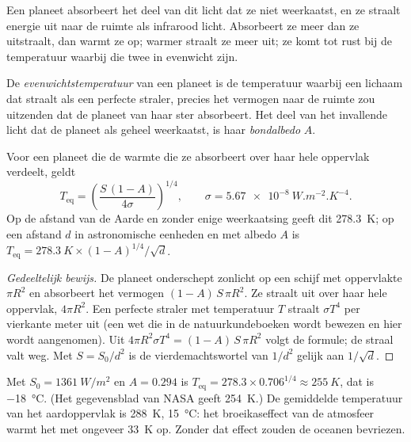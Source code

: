 Een planeet absorbeert het deel van dit licht dat ze niet weerkaatst, en ze
straalt energie uit naar de ruimte als infrarood licht. Absorbeert ze meer dan
ze uitstraalt, dan warmt ze op; warmer straalt ze meer uit; ze komt tot rust
bij de temperatuur waarbij die twee in evenwicht zijn.

\begin{definition}[Evenwichtstemperatuur]\label{def:g10:habitable-planet:equilibrium-temperature}
De \emph{evenwichtstemperatuur} van een
planeet is de temperatuur waarbij een lichaam dat straalt als een perfecte
straler, precies het vermogen naar de ruimte zou uitzenden dat de planeet van
haar ster absorbeert. Het deel van het invallende licht dat de planeet als
geheel weerkaatst, is haar \emph{bondalbedo} $A$.
\end{definition}

\begin{proposition}\label{prop:g10:habitable-planet:teq}
Voor een planeet die de warmte die ze absorbeert over haar hele oppervlak verdeelt, geldt
\[
  T_{\mathrm{eq}} = \left(\frac{S\,(1-A)}{4\sigma}\right)^{1/4},
  \qquad \sigma = \qty{5.67e-8}{W.m^{-2}.K^{-4}}.
\]
Op de afstand van de Aarde en zonder enige weerkaatsing geeft dit
\qty{278.3}{K}; op een afstand $d$ in astronomische eenheden en met albedo $A$
is $T_{\mathrm{eq}} = \qty{278.3}{K} \times (1-A)^{1/4}/\sqrt{d}$.
\end{proposition}

\begin{proof}[Gedeeltelijk bewijs]
De planeet onderschept zonlicht op een schijf met oppervlakte $\pi R^2$ en
absorbeert het vermogen $(1-A)\,S\,\pi R^2$. Ze straalt uit over haar hele
oppervlak, $4\pi R^2$. Een perfecte straler met temperatuur $T$ straalt
$\sigma T^4$ per vierkante meter uit (een wet die in de natuurkundeboeken wordt
bewezen en hier wordt aangenomen). Uit
$4\pi R^2 \sigma T^4 = (1-A)\,S\,\pi R^2$ volgt de formule; de straal valt
weg. Met $S = S_0/d^2$ is de vierdemachtswortel van $1/d^2$ gelijk aan $1/\sqrt d$.
\end{proof}

\begin{example}[De Aarde]\label{ex:g10:habitable-planet:earth}
Met $S_0 = \qty{1361}{W/m^2}$ en $A = 0.294$ is
$T_{\mathrm{eq}} = 278.3 \times 0.706^{1/4} \approx \qty{255}{K}$, dat is
\qty{-18}{\degreeCelsius}. (Het gegevensblad van NASA geeft \qty{254}{K}.) De
gemiddelde temperatuur van het aardoppervlak is \qty{288}{K},
\qty{15}{\degreeCelsius}: het broeikaseffect van de atmosfeer warmt het met
ongeveer \qty{33}{K} op. Zonder dat effect zouden de oceanen bevriezen.
\end{example}

